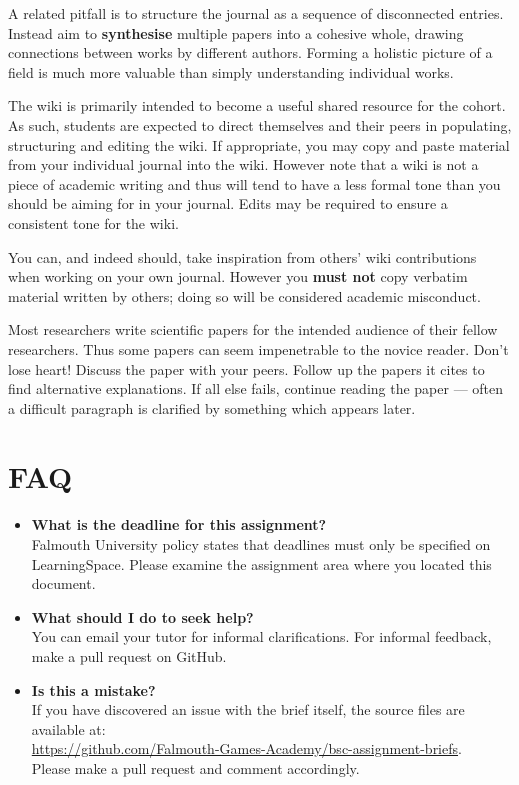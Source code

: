 \documentclass{../fal_assignment}
\begin{document}
A related pitfall is to structure the journal as a sequence of disconnected entries.
Instead aim to \textbf{synthesise} multiple papers into a cohesive whole,
drawing connections between works by different authors.
Forming a holistic picture of a field is much more valuable than simply understanding individual works.

The wiki is primarily intended to become a useful shared resource for the cohort.
As such, students are expected to direct themselves and their peers in populating, structuring and editing the wiki.
If appropriate, you may copy and paste material from your individual journal into the wiki.
However note that a wiki is not a piece of academic writing
and thus will tend to have a less formal tone than you should be aiming for in your journal.
Edits may be required to ensure a consistent tone for the wiki.

You can, and indeed should, take inspiration from others' wiki contributions when working on your own journal.
However you \textbf{must not} copy verbatim material written by others;
doing so will be considered academic misconduct.

Most researchers write scientific papers for the intended audience of their fellow researchers.
Thus some papers can seem impenetrable to the novice reader.
Don't lose heart!
Discuss the paper with your peers.
Follow up the papers it cites to find alternative explanations.
If all else fails, continue reading the paper --- often a difficult paragraph is clarified by something which appears later.

\section*{FAQ}

\begin{itemize}
	\item 	\textbf{What is the deadline for this assignment?} \\ 
    		Falmouth University policy states that deadlines must only be specified on LearningSpace. Please examine the assignment area where you located this document.
    		
	\item 	\textbf{What should I do to seek help?} \\ 
    		You can email your tutor for informal clarifications. For informal feedback, make a pull request on GitHub. 
    		
    	\item 	\textbf{Is this a mistake?} \\ 	
    		If you have discovered an issue with the brief itself, the source files are available at: \\
    		\url{https://github.com/Falmouth-Games-Academy/bsc-assignment-briefs}.\\
    		 Please make a pull request and comment accordingly.
\end{itemize}
\end{document}
